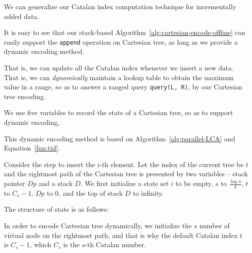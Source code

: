 
We can generalize our Catalan index computation technique for
incrementally added data.

It is easy to see that our stack-based
Algorithm~\ref{alg:cartesian-encode-offline} can easily support the
{\tt append} operation on Cartesian tree, as long as we provide a
dynamic encoding method.

That is, we can update all the Catalan index whenever we insert a new
data.  That is, we can {\em dynamically} maintain a lookup table to
obtain the maximum value in a range, so as to answer a ranged query
{\tt query(L, R)}, by our Cartesian tree encoding.



We use five variables to record the state of a Cartesian tree, so as
to support dynamic encoding,

This dynamic encoding method is based on
Algorithm~\ref{alg:parallel-LCA} and Equation~\ref{fun:tid}.

Consider the step to insert the $i$-th element.  Let the index of the
current tree be $t$ and the rightmost path of the Cartesian tree is
presented by two variables -- stack pointer $Dp$ and a stack $D$.  We
first initialize a state set $i$ to be empty, $s$ to $\frac{\log
  n}{4}$, ${t}$ to $C_s - 1$, $Dp$ to 0, and the top of stack $D$ to
infinity.

The structure of state is as follows:

\iffalse
我們定義轉移狀態由 5 個變數來決定動態笛卡爾樹的編碼，當前插入第 $i$ 個
元素，最終填充 $s$ 個元素，當前的樹編號 $\mathit{tid}$，以及笛卡爾樹的
右鏈狀態指針 $Dp$ 與其堆疊 $D$，其結構如下：
\fi







In order to encode Cartesian tree dynamically, we initialize the $s$
number of virtual node on the rightmost path, and that is why the
default Catalan index ${\mathit t}$ is $C_s - 1$, which $C_s$ is the
$s$-th Catalan number.


